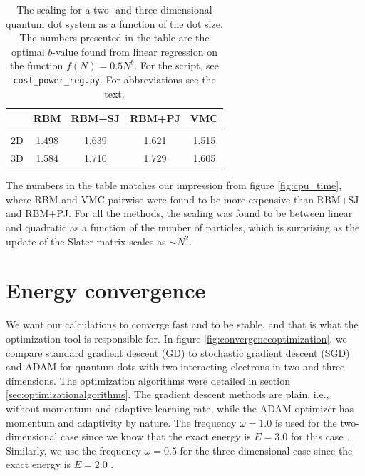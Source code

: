 \begin{table}
	\caption{The scaling for a two- and three-dimensional quantum dot system as a function of the dot size. The numbers presented in the table are the optimal $b$-value found from linear regression on the function $f(N)=0.5N^b$. For the script, see \lstinline|cost_power_reg.py|. For abbreviations see the text.}
	\begin{tabularx}{\textwidth}{CCCCC} \hline\hline
		\label{tab:cputimefit}
		\makecell{\\ \phantom{=}} & RBM & RBM+SJ & RBM+PJ & VMC \\ \hline \\
		2D & 1.498 & 1.639 & 1.621 & 1.515 \\ 
		3D & 1.584 & 1.710 & 1.729 & 1.605 \\ \hline\hline
	\end{tabularx}
\end{table}

The numbers in the table matches our impression from figure \eqref{fig:cpu_time}, where RBM and VMC pairwise were found to be more expensive than RBM+SJ and RBM+PJ. For all the methods, the scaling was found to be between linear and quadratic as a function of the number of particles, which is surprising as the update of the Slater matrix scales as $\sim N^2$. 

\newpage
\section{Energy convergence}
We want our calculations to converge fast and to be stable, and that is what the optimization tool is responsible for. In figure \eqref{fig:convergenceoptimization}, we compare standard gradient descent (GD) to stochastic gradient descent (SGD) and ADAM for quantum dots with two interacting electrons in two and three dimensions. The optimization algorithms were detailed in section \ref{sec:optimizationalgorithms}. The gradient descent methods are plain, i.e., without momentum and adaptive learning rate, while the ADAM optimizer has momentum and adaptivity by nature. The frequency $\omega=1.0$ is used for the two-dimensional case since we know that the exact energy is $E=3.0$ for this case \cite{taut_two_1993}. Similarly, we use the frequency $\omega=0.5$ for the three-dimensional case since the exact energy is $E=2.0$ \cite{taut_two_1994}. 

